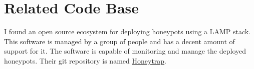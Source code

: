\documentclass[journal]{IEEEtran}
\begin{document}
    \section{Related Code Base}
    \label{sec:code}
        I found an open source ecosystem for deploying honeypots using a LAMP stack.
        This software is managed by a group of people and has a decent amount of support for it.
        The software is capable of monitoring and manage the deployed honeypots.
        Their git repository is named \href{https://github.com/honeytrap/honeytrap}{Honeytrap}.


    
    

    \flushend
\end{document}
